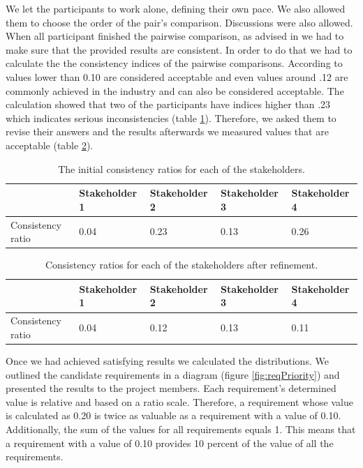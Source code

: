 We let the participants to work alone, defining their own pace. We also allowed them to choose the order of the pair's comparison. Discussions were also allowed. When all participant finished the pairwise comparison, as advised in \cite{karlsson1997cost} we had to make sure that the provided results are consistent. In order to do that we had to calculate the the consistency indices of the pairwise comparisons. According to \cite{karlsson1997cost} values lower than 0.10 are considered acceptable and even values around .12 are commonly achieved in the industry and can also be considered acceptable. The calculation showed that two of the participants have indices higher than .23 which indicates serious inconsistencies (table \ref{tbl:reqInitialConsist}). Therefore, we asked them to revise their answers and the results afterwards we measured values that are acceptable (table \ref{tbl:reqFinalConsist}).
 
 \begin{table}[h!]
  \begin{center}
    \begin{tabular}{| l | l | l | l | l |}
    \hline
    & Stakeholder 1 & Stakeholder 2 & Stakeholder 3 & Stakeholder 4 \\	 \hline
    Consistency ratio & 0.04 & 0.23 & 0.13 & 0.26 \\
    \hline
    \end{tabular}
  \end{center}
  \caption{The initial consistency ratios for each of the stakeholders.}
  \label{tbl:reqInitialConsist}
\end{table}


 \begin{table}[h!]
  \begin{center}
    \begin{tabular}{| l | l | l | l | l |}
    \hline
    & Stakeholder 1 & Stakeholder 2 & Stakeholder 3 & Stakeholder 4 \\	 \hline
    Consistency ratio & 0.04 & 0.12 & 0.13 & 0.11 \\
    \hline
    \end{tabular}
  \end{center}
  \caption{Consistency ratios for each of the stakeholders after refinement.}
  \label{tbl:reqFinalConsist}
\end{table}

Once we had achieved satisfying results we calculated the distributions. We outlined the candidate requirements in a diagram (figure \ref{fig:reqPriority}) and presented the results to the project members. Each requirement's determined value is relative and based on a ratio scale. Therefore, a requirement whose value is calculated as 0.20 is twice as valuable as a requirement with a value of 0.10. Additionally, the sum of the values for all requirements equals 1. This means that a requirement with a value of 0.10 provides 10 percent of the value of all the requirements.

